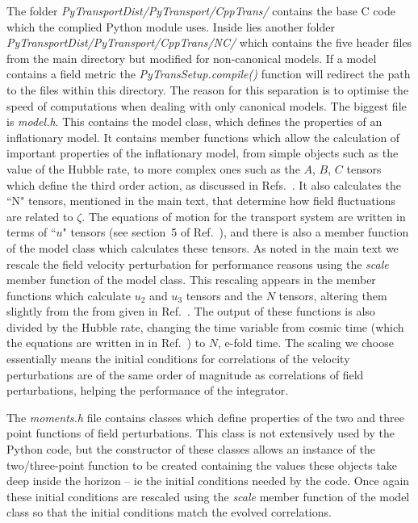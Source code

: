 \documentclass[10pt,
amsmath,amssymb,
aps,prd,nofootinbib,eqsecnum,a4paper]{revtex4}
\newcommand{\CC}{C\nolinebreak\hspace{-.05em}\raisebox{.4ex}{\tiny\bf +}\nolinebreak\hspace{-.10em}\raisebox{.4ex}{\tiny\bf +}}
\def\CC{{C\nolinebreak[4]\hspace{-.05em}\raisebox{.4ex}{\tiny\bf ++}}}
\def\S{ }
\begin{document}
\noindent The folder  {\it PyTransportDist/PyTransport/CppTrans/} contains the base \CC \S code which the complied Python module uses.
Inside lies another folder {\it PyTransportDist/PyTransport/CppTrans/NC/} which contains the 
five header files from the main directory but modified for non-canonical models. If a model contains a field metric the {\it PyTransSetup.compile()} function will redirect the path to the files within this directory. 
The reason for this separation is to optimise the speed of computations when dealing with only canonical models.
The biggest file is {\it model.h}. This contains the model class, which 
defines the properties of an inflationary model. It contains member functions which allow the calculation of important 
properties of the inflationary model, from simple objects such as the value of the Hubble rate, to more complex ones such 
as the 
$A$, $B$, $C$ tensors which define the third order action, as discussed in Refs.~\cite{xxx,newPaper}. It also calculates the ``N" tensors, 
mentioned in the main text,
that determine how field fluctuations are related to $\zeta$. 
The equations of motion for the transport system are written in terms of ``$u$" tensors (see section~5 of Ref.~\cite{xxx}), and there is also a member function of the model class which calculates these tensors. As noted in the main text 
we rescale the field velocity perturbation for performance 
reasons using the {\it scale} member function of the model class. This rescaling appears in the 
member functions which calculate $u_2$ and $u_3$ tensors and the $N$ tensors, altering them slightly 
from the from given in Ref.~\cite{xxx}.
The output of these functions is also divided by the Hubble rate, changing the 
time variable from cosmic time (which the equations are written in in Ref.~\cite{xxx}) 
to $N$, e-fold time.  The scaling we choose essentially means the initial conditions for 
correlations of the velocity perturbations
are of the same order of magnitude as correlations of field perturbations, helping the performance of the integrator. 

The {\it moments.h} file contains classes which define properties of the two and three point functions of field perturbations. 
This class is not extensively used by the Python code, but the constructor of these classes allows an instance of the 
two/three-point function to be created containing the values these objects take deep inside the horizon -- ie the initial 
conditions needed by the code. 
Once again these initial conditions are rescaled using the {\it scale} member function of the model class so that the initial 
conditions match the evolved 
correlations.
\end{document}
